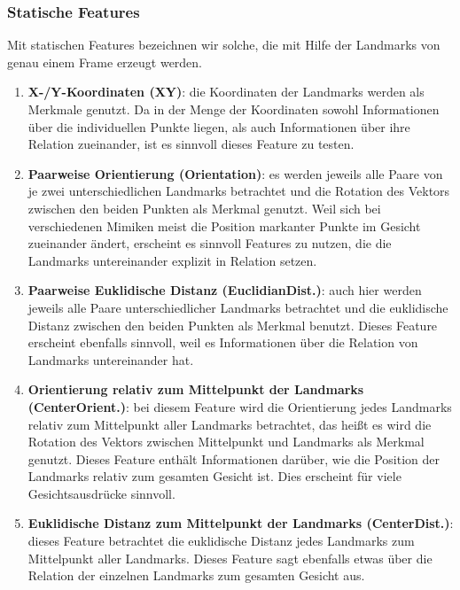 \subsubsection{Statische Features}
Mit statischen Features bezeichnen wir solche, die mit Hilfe der Landmarks von genau einem Frame erzeugt werden.
\begin{enumerate}
  \item \textbf{X-/Y-Koordinaten (XY)}: die Koordinaten der Landmarks werden als Merkmale genutzt. Da in der Menge der Koordinaten sowohl Informationen
        über die individuellen Punkte liegen, als auch Informationen über ihre Relation zueinander, ist es sinnvoll dieses Feature zu testen.

    \item \textbf{Paarweise Orientierung (Orientation)}: es werden jeweils alle Paare von je zwei unterschiedlichen Landmarks betrachtet und die Rotation des Vektors zwischen
        den beiden Punkten als Merkmal genutzt. Weil sich bei verschiedenen Mimiken meist die Position markanter Punkte im Gesicht zueinander ändert, erscheint es sinnvoll
        Features zu nutzen, die die Landmarks untereinander explizit in Relation setzen.

      \item \textbf{Paarweise Euklidische Distanz (EuclidianDist.)}: auch hier werden jeweils alle Paare unterschiedlicher Landmarks betrachtet und die euklidische Distanz zwischen
        den beiden Punkten als Merkmal benutzt. Dieses Feature erscheint ebenfalls sinnvoll, weil es Informationen über die Relation von Landmarks untereinander hat.

      \item \textbf{Orientierung relativ zum Mittelpunkt der Landmarks (CenterOrient.)}: bei diesem Feature wird die Orientierung jedes Landmarks relativ zum Mittelpunkt aller Landmarks betrachtet,
        das heißt es wird die Rotation des Vektors zwischen Mittelpunkt und Landmarks als Merkmal genutzt. Dieses Feature enthält Informationen darüber, wie die Position der Landmarks relativ
        zum gesamten Gesicht ist. Dies erscheint für viele Gesichtsausdrücke sinnvoll.

      \item \textbf{Euklidische Distanz zum Mittelpunkt der Landmarks (CenterDist.)}: dieses Feature betrachtet die euklidische Distanz jedes Landmarks zum Mittelpunkt aller Landmarks. Dieses Feature sagt ebenfalls
        etwas über die Relation der einzelnen Landmarks zum gesamten Gesicht aus.


\end{enumerate}
